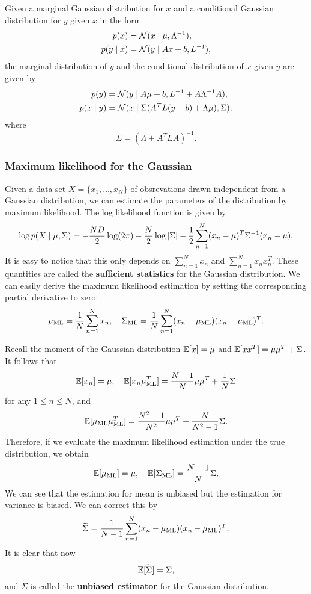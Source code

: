 \documentclass[a4paper]{article}
\begin{document}
\begin{thm}
Given a marginal Gaussian distribution for $x$ and a 
conditional Gaussian distribution for $y$ given $x$ in 
the form
\[
\begin{aligned}
p(x) &= \mathcal{N} (x \mid \mu, \Lambda^{-1}), \\
p(y \mid x) &= \mathcal{N} (y \mid A x + b, L^{-1}),
\end{aligned}
\]
the marginal distribution of $y$ and the conditional 
distribution of $x$ given $y$ are given by 
\[
\begin{aligned}
p(y) &= \mathcal{N} (y \mid A \mu + b, L^{-1} + A \Lambda^{-1} A), \\
p(x \mid y) &= \mathcal{N} (x \mid \Sigma (A^T L (y - b) + 
\Lambda \mu), \Sigma),
\end{aligned}
\]
where 
\[
\Sigma = (\Lambda + A^T L A)^{-1}.
\]
\end{thm}

\subsubsection{Maximum likelihood for the Gaussian}

Given a data set $X = \{x_1, \dots, x_N\}$ of obsrevations 
drawn independent from a Gaussian distribution, we can 
estimate the parameters of the distribution by maximum 
likelihood. The log likelihood function is given by
\[
\log p(X \mid \mu, \Sigma)
= -\frac{N D}{2} \log (2 \pi) - \frac{N}{2} \log \left\lvert \Sigma\right\rvert
- \frac{1}{2} \sum_{n=1}^N (x_n - \mu)^T \Sigma^{-1} 
(x_n - \mu).
\]
It is easy to notice that this only depends on $\sum_{n=1}^N 
x_n$ and $\sum_{n=1}^N x_n x_n^T$. These quantities are 
called the \textbf{sufficient statistics} for the Gaussian 
distribution. We can easily 
derive the maximum likelihood estimation by setting the
corresponding partial derivative to zero: 
\[
\mu_{\text{ML}} = \frac{1}{N} \sum_{n=1}^N x_n, 
\quad 
\Sigma_{\text{ML}} = \frac{1}{N} \sum_{n=1}^N 
(x_n - \mu_{\text{ML}}) (x_n - \mu_{\text{ML}})^T.
\]

Recall the moment of the Gaussian distribution 
$\mathbb{E}[x] = \mu$ and $\mathbb{E}[x x^T] = \mu \mu^T + \Sigma$.
It follows that 
\[
\begin{aligned}
\mathbb{E}[x_n] = \mu, 
\quad 
\mathbb{E}[x_n \mu_{\text{ML}}^T] 
= \frac{N - 1}{N} \mu \mu^T + \frac{1}{N} \Sigma
\end{aligned}
\]
for any $1 \leq n \leq N$, and 
\[
\mathbb{E}[\mu_{\text{ML}} \mu_{\text{ML}}^T]
= \frac{N^2 - 1}{N^2} \mu \mu^T 
+ \frac{N}{N^2 - 1} \Sigma.
\]
Therefore, if we evaluate the maximum likelihood estimation 
under the true distribution, we obtain
\[
\mathbb{E}[\mu_{\text{ML}}] = \mu,
\quad 
\mathbb{E}[\Sigma_{\text{ML}}] = \frac{N - 1}{N} \Sigma,
\]
We can see that the estimation for mean is unbiased but the 
estimation for variance is biased. We can correct this 
by 
\[
\widetilde{\Sigma} = \frac{1}{N - 1} \sum_{n=1}^N 
(x_n - \mu_{\text{ML}}) (x_n - \mu_{\text{ML}})^T.
\]
It is clear that now 
\[
\mathbb{E}[\widetilde{\Sigma}] = \Sigma,
\]
and $\tilde{\Sigma}$ is called the \textbf{unbiased 
estimator} for the Gaussian distribution.
\end{document}
